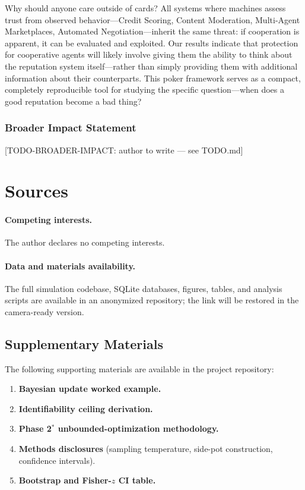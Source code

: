\documentclass[10pt]{article} %
\begin{document}
Why should anyone care outside of cards? All systems where machines
assess trust from observed behavior---Credit Scoring, Content
Moderation, Multi-Agent Marketplaces, Automated Negotiation---inherit
the same threat: if cooperation is apparent, it can be evaluated and
exploited. Our results indicate that protection for cooperative
agents will likely involve giving them the ability to think about the
reputation system itself---rather than simply providing them with
additional information about their counterparts. This poker framework
serves as a compact, completely reproducible tool for studying the
specific question---when does a good reputation become a bad thing?

\subsubsection*{Broader Impact Statement}
[TODO-BROADER-IMPACT: author to write --- see TODO.md]

\section*{Sources}

\paragraph*{Competing interests.} The author declares no competing
interests.

\paragraph*{Data and materials availability.}
The full simulation codebase, SQLite databases, figures, tables,
and analysis scripts are available in an anonymized repository; the link will be
restored in the camera-ready version.



\subsection*{Supplementary Materials}
The following supporting materials are available in the project
repository:
\footnotesize\raggedright
\begin{enumerate}\setlength{\itemsep}{2pt}\setlength{\parskip}{0pt}\setlength{\leftmargini}{1.5em}
  \item \textbf{Bayesian update worked example.} 
  \item \textbf{Identifiability ceiling derivation.} 
  \item \textbf{Phase 2$^{*}$ unbounded-optimization methodology.} 
  \item \textbf{Methods disclosures} (sampling temperature, side-pot construction, confidence intervals). 
  \item \textbf{Bootstrap and Fisher-$z$ CI table.} 
\end{enumerate}
\end{document}
